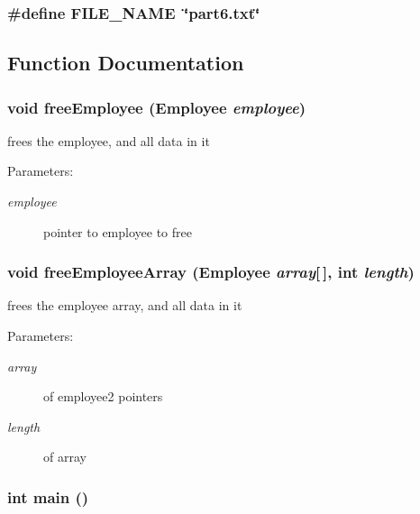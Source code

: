 \subsubsection{\setlength{\rightskip}{0pt plus 5cm}\#define FILE\_\-NAME~\char`\"{}part6.txt\char`\"{}}\label{part6_8c_b117546549783a058d0321a287699579}




\subsection{Function Documentation}
\subsubsection{\setlength{\rightskip}{0pt plus 5cm}void free\-Employee (\bf{Employee} {\em employee})}\label{part6_8c_1382781984017ba4d7c3965bd39535cb}


frees the employee, and all data in it \begin{Desc}
\item[Parameters:]
\begin{description}
\item[{\em employee}]pointer to employee to free \end{description}
\end{Desc}
\subsubsection{\setlength{\rightskip}{0pt plus 5cm}void free\-Employee\-Array (\bf{Employee} {\em array}[$\,$], int {\em length})}\label{part6_8c_0de2fa2b213192c6f4be528258f5f78a}


frees the employee array, and all data in it \begin{Desc}
\item[Parameters:]
\begin{description}
\item[{\em array}]of employee2 pointers \item[{\em length}]of array \end{description}
\end{Desc}
\subsubsection{\setlength{\rightskip}{0pt plus 5cm}int main ()}\label{part6_8c_e66f6b31b5ad750f1fe042a706a4e3d4}



